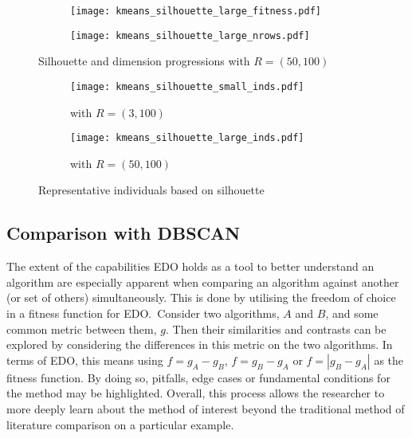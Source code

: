 \begin{figure}
    \centering
    \begin{subfigure}{\imgwidth}
        \texttt{[image: kmeans\_silhouette\_large\_fitness.pdf]}
        \label{fig:kmeans_silhouette_large_fitness}
    \end{subfigure}

    \begin{subfigure}{\imgwidth}
        \texttt{[image: kmeans\_silhouette\_large\_nrows.pdf]}
        \label{fig:kmeans_silhouette_large_nrows}
    \end{subfigure}
    \caption{%
        Silhouette and dimension progressions with \(R=(50, 100)\)
    }\label{fig:large-silhouette}
\end{figure}

\begin{figure}
    \centering
    \begin{subfigure}{\imgwidth}
        \texttt{[image: kmeans\_silhouette\_small\_inds.pdf]}
        \caption{with \(R=(3, 100)\)}\label{fig:kmeans_silhouette_small_inds}
    \end{subfigure}

    \begin{subfigure}{\imgwidth}
        \texttt{[image: kmeans\_silhouette\_large\_inds.pdf]}
        \caption{with \(R=(50, 100)\)}\label{fig:kmeans_silhouette_large_inds}
    \end{subfigure}
    \caption{%
        Representative individuals based on silhouette
    }\label{fig:silhouette-inds}
\end{figure}

\subsection{Comparison with DBSCAN}\label{subsec:dbscan}

The extent of the capabilities EDO holds as a tool to better understand an
algorithm are especially apparent when comparing an algorithm against another
(or set of others) simultaneously. This is done by utilising the freedom of
choice in a fitness function for EDO.\ Consider two algorithms, \(A\) and \(B\),
and some common metric between them, \(g\). Then their similarities and
contrasts can be explored by considering the differences in this metric on the
two algorithms. In terms of EDO, this means using \(f = g_A - g_B\), \(f = g_B -
g_A\) or \(f = \left| g_B - g_A \right|\) as the fitness function. By doing so,
pitfalls, edge cases or fundamental conditions for the method may be
highlighted. Overall, this process allows the researcher to more deeply learn
about the method of interest beyond the traditional method of literature
comparison on a particular example.


